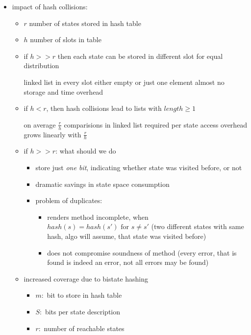\documentclass[a4paper, 10pt]{article}
\begin{document}
\begin{itemize}
    \item impact of hash collisions:
    \begin{itemize}
        \item $r$ number of states stored in hash table
        \item $h$ number of slots in table
        \item if $h>>r$ then each state can be stored in different slot for equal distribution
        \begin{itemize}
            \fitem linked list in every slot either empty or just one element
            \fitem almost no storage and time overhead
        \end{itemize}
        \item if $h<r$, then hash collisions lead to lists with $length\geq1$
        \begin{itemize}
            \fitem on average $\frac{r}{h}$ comparisions in linked list required per state access
            \fitem overhead grows linearly with $\frac{r}{h}$
        \end{itemize}
        \item if $h>>r$: what should we do
        \begin{itemize}
            \item store just \emph{one bit}, indicating whether state was visited before, or not
            \item dramatic savings in state space consumption
            \item problem of duplicates:
            \begin{itemize}
                \item renders method incomplete, when $hash(s)=hash(s')\textrm{ for } s\not=s'$ {\tiny (two different states with same hash, algo will assume, that state was visited before)}
                \item does not compromise soundness of method {\tiny (every error, that is found is indeed an error, not all errors may be found)}
            \end{itemize}
        \end{itemize}
        \item increased coverage due to bistate hashing
        \begin{itemize}
            \item $m:$ bit to store in hash table
            \item $S:$ bits per state description
            \item $r:$ number of reachable states

\end{itemize}
\end{itemize}
\end{itemize}
\end{document}
